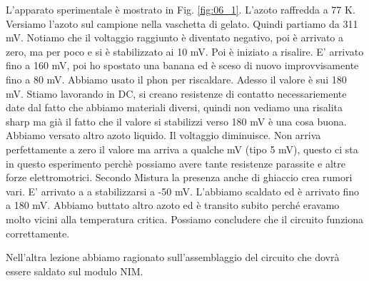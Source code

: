 \documentclass[../main/main.tex]{subfiles}
\begin{document}
L'apparato sperimentale è mostrato in Fig. \ref{fig:06_1}.
L'azoto raffredda a 77 K. Versiamo l'azoto sul campione nella vaschetta di gelato. Quindi partiamo da 311 mV.
Notiamo che il voltaggio raggiunto è diventato negativo, poi è arrivato a zero, ma per poco e si è stabilizzato ai 10 mV. Poi è iniziato a risalire. E' arrivato fino a 160 mV, poi ho spostato una banana ed è sceso di nuovo improvvisamente fino a 80 mV. Abbiamo usato il phon per riscaldare. Adesso il valore è sui 180 mV. Stiamo lavorando in DC, si creano resistenze di contatto necessariemente date dal fatto che abbiamo materiali diversi, quindi non vediamo una risalita sharp ma già il fatto che il valore si stabilizzi verso 180 mV è una cosa buona. Abbiamo versato altro azoto liquido. Il voltaggio diminuisce. Non arriva perfettamente a zero il valore ma arriva a qualche mV (tipo 5 mV), questo ci sta in questo esperimento perchè possiamo avere tante resistenze parassite e altre forze elettromotrici. Secondo Mistura la presenza anche di ghiaccio crea rumori vari.
E' arrivato a a stabilizzarsi a -50 mV. L'abbiamo scaldato ed è arrivato fino a 180 mV. Abbiamo buttato altro azoto ed è transito subito perché eravamo molto vicini alla temperatura critica.
Possiamo concludere che il circuito funziona correttamente.





Nell'altra lezione abbiamo ragionato sull'assemblaggio del circuito che dovrà essere saldato sul modulo NIM.
\end{document}
